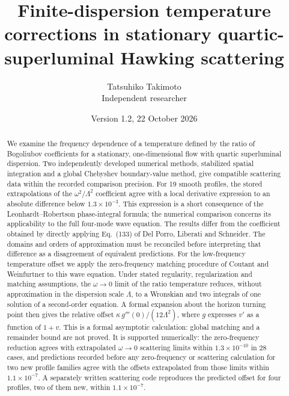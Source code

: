 \documentclass[10pt,a4paper]{article}
\title{Finite-dispersion temperature corrections in stationary\newline
quartic-superluminal Hawking scattering}
\author{Tatsuhiko Takimoto\\\small Independent researcher}
\date{Version 1.2, 22 October 2026}
\begin{document}
\maketitle
\begin{abstract}
We examine the frequency dependence of a temperature defined by the ratio
of Bogoliubov coefficients for a stationary, one-dimensional flow with
quartic superluminal dispersion. Two independently developed numerical
methods, stabilized spatial integration and a global Chebyshev boundary-value
method, give compatible scattering data within the recorded comparison
precision. For 19 smooth profiles, the stored extrapolations of the
$\omega^2/\Lambda^2$ coefficient agree with a local derivative expression
to an absolute difference below $1.3\times10^{-3}$. This expression is a
short consequence of the Leonhardt--Robertson phase-integral formula;
the numerical comparison concerns its applicability to the full four-mode
wave equation. The results differ from the coefficient obtained by directly
applying Eq.~(133) of Del Porro, Liberati and Schneider. The domains and
orders of approximation must be reconciled before interpreting that
difference as a disagreement of equivalent predictions. For the
low-frequency temperature offset we apply the zero-frequency matching
procedure of Coutant and Weinfurtner to this wave equation. Under stated
regularity, regularization and matching assumptions, the $\omega\to0$ limit
of the ratio temperature reduces, without approximation in the dispersion
scale $\Lambda$, to a Wronskian and two integrals of one solution of a
second-order equation. A formal expansion about the horizon turning point
then gives the relative offset $\kappa\,g'''(0)/(12\Lambda^2)$, where $g$
expresses $v'$ as a function of $1+v$. This is a formal asymptotic
calculation: global matching and a remainder bound are not proved. It is
supported numerically: the zero-frequency reduction agrees with
extrapolated $\omega\to0$ scattering limits within $1.3\times10^{-10}$ in
$28$ cases, and predictions recorded before any zero-frequency or
scattering calculation for two new profile families agree with the offsets
extrapolated from those limits within $1.1\times10^{-7}$. A separately
written scattering code reproduces the predicted offset for four profiles,
two of them new, within $1.1\times10^{-7}$.
\end{abstract}
\end{document}
